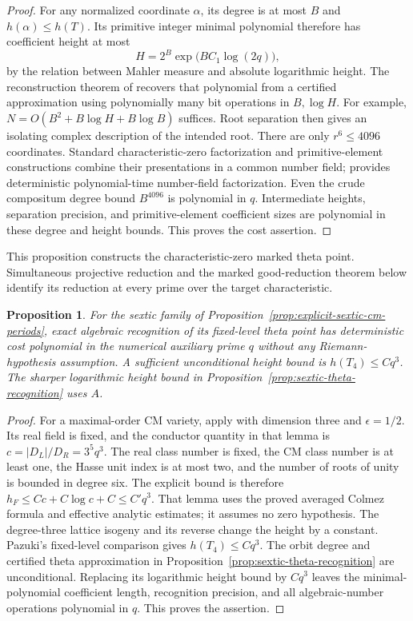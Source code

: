 \documentclass[11pt]{article}
\newtheorem{proposition}[theorem]{Proposition}
\theoremstyle{definition}
\theoremstyle{remark}
\begin{document}
\begin{proof}
For any normalized coordinate \(\alpha\), its degree is at most
\(B\) and \(h(\alpha)\leq h(T)\). Its primitive integer minimal
polynomial therefore has coefficient height at most
\[
 H=2^B\exp\bigl(B C_1\log(2q)\bigr),
\]
by the relation between Mahler measure and absolute logarithmic height.
The reconstruction theorem of
\citet[Theorem~1.19, p.~241]{KannanLenstraLovasz1988}
recovers that polynomial from a certified approximation using
polynomially many bit operations in \(B,\log H\). For example,
\(N=O(B^2+B\log H+B\log B)\) suffices. Root separation then gives
an isolating complex description of the intended root. There are only
\(r^6\leq4096\) coordinates. Standard characteristic-zero factorization and
primitive-element constructions combine their presentations in a
common number field; \citet[Theorem~4.5, pp.~253--254]{Lenstra1983}
provides deterministic polynomial-time number-field factorization.
Even the crude compositum degree bound \(B^{4096}\) is polynomial in
\(q\). Intermediate heights, separation precision, and primitive-element
coefficient sizes are polynomial in these degree and height bounds.
This proves the cost assertion.
\end{proof}

This proposition constructs the characteristic-zero marked theta point. Simultaneous projective reduction and the marked good-reduction theorem below identify its reduction at every prime over the target characteristic.


\begin{proposition}\label{prop:unconditional-cm-recognition}
For the sextic family of Proposition~\ref{prop:explicit-sextic-cm-periods},
exact algebraic recognition of its fixed-level theta point has
deterministic cost polynomial in the numerical auxiliary prime \(q\)
without any Riemann-hypothesis assumption. A sufficient unconditional
height bound is \(h(T_4)\le Cq^3\). The sharper logarithmic height
bound in Proposition~\ref{prop:sextic-theta-recognition} uses \(A\).
\end{proposition}
\begin{proof}
For a maximal-order CM variety, apply
\citet[Lemma~7.10, printed p.~63; equation~(7.7), p.~62]{VonKanelKret2023}
with dimension three and \(\epsilon=1/2\). Its real field is fixed,
and the conductor quantity in that lemma is
\(c=|D_L|/D_R=3^5q^3\). The real class number is fixed, the CM
class number is at least one, the Hasse unit index is at most two,
and the number of roots of unity is bounded in degree six. The explicit
bound is therefore \(h_F\le Cc+C\log c+C\le C'q^3\).
That lemma uses the proved averaged Colmez formula and effective
analytic estimates; it assumes no zero hypothesis. The degree-three
lattice isogeny and its reverse change the height by a constant.
Pazuki's fixed-level comparison gives \(h(T_4)\le Cq^3\).
The orbit degree and certified theta approximation in
Proposition~\ref{prop:sextic-theta-recognition} are unconditional.
Replacing its logarithmic height bound by \(Cq^3\) leaves the
minimal-polynomial coefficient length, recognition precision, and
all algebraic-number operations polynomial in \(q\). This proves
the assertion.
\end{proof}
\end{document}
